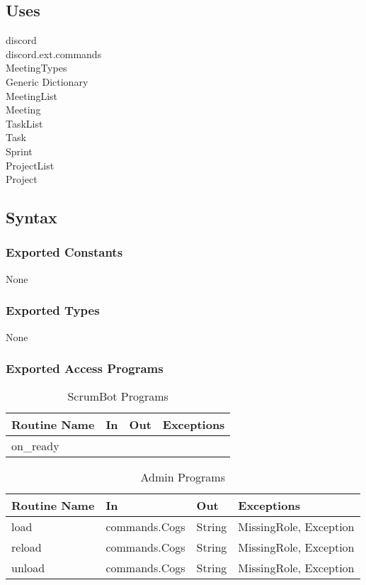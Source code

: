 \documentclass[12pt, titlepage]{article}
\begin{document}
\subsection* {Uses}
discord\\
discord.ext.commands\\
MeetingTypes\\
Generic Dictionary\\
MeetingList\\
Meeting\\
TaskList\\
Task\\
Sprint\\
ProjectList\\
Project

\subsection* {Syntax}
\subsubsection* {Exported Constants}
None

\subsubsection* {Exported Types}
None

\subsubsection* {Exported Access Programs}
\begin{table}[!htb]
    \centering
    \begin{tabular}{|p{3cm}|p{3cm}|p{3cm}|p{4.5cm}|}
        \hline
        \textbf{Routine Name} & \textbf{In} & \textbf{Out} & \textbf{Exceptions} \\
        \hline
        on\_ready & & & \\
        \hline
    \end{tabular}
    \caption{ScrumBot Programs}
    \label{tab:scrumbot}
\end{table}

\begin{table}[!htb]
    \centering
    \begin{tabular}{|p{3cm}|p{3cm}|p{3cm}|p{4.5cm}|}
        \hline
        \textbf{Routine Name} & \textbf{In} & \textbf{Out} & \textbf{Exceptions} \\
        \hline
        load & commands.Cogs & String & MissingRole, Exception \\
        \hline
        reload & commands.Cogs & String & MissingRole, Exception \\
        \hline
        unload & commands.Cogs & String & MissingRole, Exception \\
        \hline
    \end{tabular}
    \caption{Admin Programs}
    \label{tab:admin}
\end{table}
\end{document}
